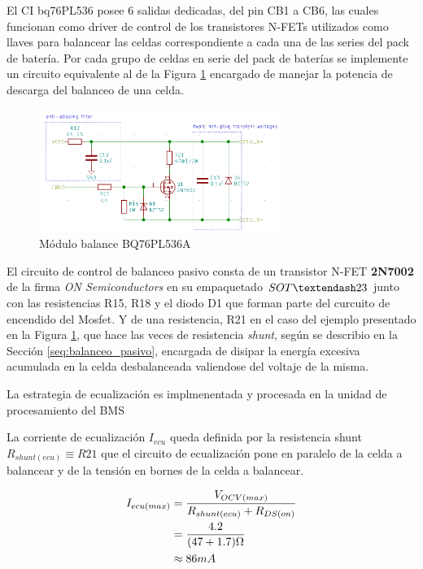 \documentclass[10pt, a4paper]{article}
\begin{document}
El \acrshort{CI} bq76PL536 posee 6 salidas dedicadas, del pin CB1 a CB6, las
cuales funcionan como driver de control de los transistores N-FETs utilizados
como llaves para balancear las celdas correspondiente a cada una de las series
del pack de batería.
Por cada grupo de celdas en serie del pack de baterías se implemente un circuito
equivalente al de la Figura \ref{fig:bq76_balance_power} encargado de manejar
la potencia de descarga del balanceo de una celda.

\begin{figure}[!h]
    \begin{center}
        \includegraphics[width=0.7\textwidth]{hardware/bat_monitor/bat_mon_balance.png}
        \caption{Módulo balance BQ76PL536A}
        \label{fig:bq76_balance_power}
    \end{center}
\end{figure}

El circuito de control de balanceo pasivo consta de un transistor N-FET
\textbf{2N7002} de la firma \emph{ON Semiconductors} en su empaquetado $SOT\textendash23$
junto con las resistencias R15, R18 y el diodo D1 que forman parte del curcuito
de encendido del Mosfet. Y de una resistencia, R21 en el caso del ejemplo
presentado en la Figura \ref{fig:bq76_balance_power}, que hace las veces de
resistencia \emph{shunt}, según se describio en la Sección
\ref{seq:balanceo_pasivo}, encargada de disipar la energía excesiva acumulada en
la celda desbalanceada valiendose del voltaje de la misma. 

La estrategia de ecualización es implmenentada y procesada en la unidad de
procesamiento del \acrshort{BMS}

La corriente de ecualización $I_{ecu}$ queda definida por la resistencia shunt
$R_{shunt(ecu)} \equiv R21$ que el circuito de ecualización pone en paralelo de
la celda a balancear y de la tensión en bornes de la celda a balancear. 

\begin{align}
    I_{ecu (max)} &= \frac{V_{OCV(max)}}{R_{shunt(ecu)}+R_{DS (on)}}\\
    &= \frac{4.2}{(47 + 1.7)\ohm}\\
    &\approx 86mA
\end{align}
\end{document}
